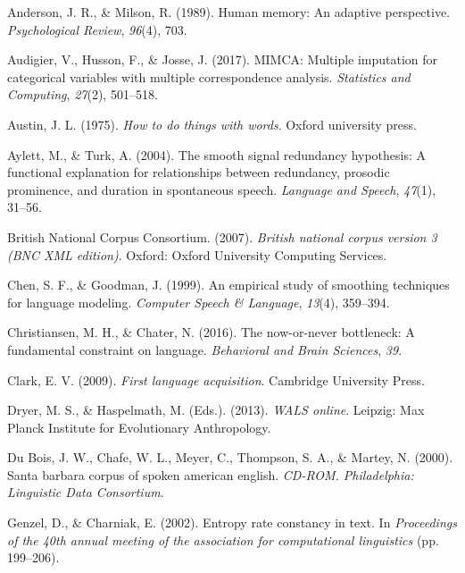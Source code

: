 \documentclass[10pt, letterpaper]{article}
\begin{document}
\setlength{\parindent}{-0.1in} 
\setlength{\leftskip}{0.125in}

\noindent

\hypertarget{refs}{}
\leavevmode\hypertarget{ref-anderson1989}{}%
Anderson, J. R., \& Milson, R. (1989). Human memory: An adaptive
perspective. \emph{Psychological Review}, \emph{96}(4), 703.

\leavevmode\hypertarget{ref-audigier2017}{}%
Audigier, V., Husson, F., \& Josse, J. (2017). MIMCA: Multiple
imputation for categorical variables with multiple correspondence
analysis. \emph{Statistics and Computing}, \emph{27}(2), 501--518.

\leavevmode\hypertarget{ref-austin1975}{}%
Austin, J. L. (1975). \emph{How to do things with words}. Oxford
university press.

\leavevmode\hypertarget{ref-aylett2004}{}%
Aylett, M., \& Turk, A. (2004). The smooth signal redundancy hypothesis:
A functional explanation for relationships between redundancy, prosodic
prominence, and duration in spontaneous speech. \emph{Language and
Speech}, \emph{47}(1), 31--56.

\leavevmode\hypertarget{ref-british-national-corpus-consortium2007}{}%
British National Corpus Consortium. (2007). \emph{British national
corpus version 3 (BNC XML edition)}. Oxford: Oxford University Computing
Services.

\leavevmode\hypertarget{ref-chen1999}{}%
Chen, S. F., \& Goodman, J. (1999). An empirical study of smoothing
techniques for language modeling. \emph{Computer Speech \& Language},
\emph{13}(4), 359--394.

\leavevmode\hypertarget{ref-christiansen2016}{}%
Christiansen, M. H., \& Chater, N. (2016). The now-or-never bottleneck:
A fundamental constraint on language. \emph{Behavioral and Brain
Sciences}, \emph{39}.

\leavevmode\hypertarget{ref-clark2009}{}%
Clark, E. V. (2009). \emph{First language acquisition}. Cambridge
University Press.

\leavevmode\hypertarget{ref-2013}{}%
Dryer, M. S., \& Haspelmath, M. (Eds.). (2013). \emph{WALS online}.
Leipzig: Max Planck Institute for Evolutionary Anthropology.

\leavevmode\hypertarget{ref-sbc}{}%
Du Bois, J. W., Chafe, W. L., Meyer, C., Thompson, S. A., \& Martey, N.
(2000). Santa barbara corpus of spoken american english. \emph{CD-ROM.
Philadelphia: Linguistic Data Consortium}.

\leavevmode\hypertarget{ref-genzel2002}{}%
Genzel, D., \& Charniak, E. (2002). Entropy rate constancy in text. In
\emph{Proceedings of the 40th annual meeting of the association for
computational linguistics} (pp. 199--206).
\end{document}
